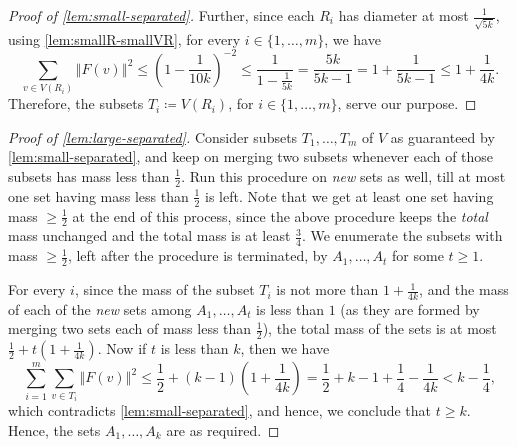 \documentclass[12pt,a4paper,bold]{thesis}
\theoremstyle{definition}
\newcommand*{\norm}[2][]{\left\Vert #2 \right\Vert_{#1}}
\begin{document}
\begin{proof}[Proof of \cref{lem:small-separated}]
    Further, since each $R_i$ has diameter at most $\frac{1}{\sqrt{5k}}$, using 
    \cref{lem:smallR-smallVR}, for every $i \in \{1, \dots, m\}$, we have
    \begin{equation*}
        \sum_{v \in V(R_i)} \norm{F(v)}^2 \leq \left(1 - \frac{1}{10k}\right)^{-2}
        \leq \frac{1}{1 - \frac{1}{5k}} = \frac{5k}{5k-1} = 1 + \frac{1}{5k-1}
        \leq 1 + \frac{1}{4k}.
    \end{equation*} 
	Therefore, the subsets $T_i \coloneq V(R_i)$, for $i \in \{1, \dots, m\}$, serve our purpose.
\end{proof}

\begin{proof}[Proof of \cref{lem:large-separated}]
    Consider subsets $T_1, \dots, T_m$ of $V$ as guaranteed by \cref{lem:small-separated},
    and keep on merging two subsets whenever each of those subsets has mass less than 
    $\frac{1}{2}$. Run this procedure on \emph{new} sets as well, till at most one set 
    having mass less than $\frac{1}{2}$ is left. Note that we get at least one set 
    having mass $\geq \frac{1}{2}$ at the end of this process, since the above procedure 
    keeps the \emph{total} mass unchanged and the total mass is at least $\frac{3}{4}$. 
    We enumerate the subsets with mass $\geq \frac{1}{2}$, 
    left after the procedure is terminated, by $A_1, \dots, A_t$ for some $t \geq 1$. 

    For every $i$, since the mass of the subset $T_i$ is not more than $1 + \frac{1}{4k}$, 
    and the mass of each of the \emph{new} sets among $A_1, \dots, A_t$ is less than $1$ 
    (as they are formed by merging two sets each of mass less than $\frac{1}{2}$), 
    the total mass of the sets is at most $\frac{1}{2} + t \left(1 + \frac{1}{4k}\right)$.
    Now if $t$ is less than $k$, then we have
    \begin{equation*}
        \sum_{i=1}^{m} \sum_{v \in T_i} \norm{F(v)}^2 
        \leq \frac{1}{2} + (k-1) \left(1 + \frac{1}{4k}\right)
        = \frac{1}{2} + k - 1 + \frac{1}{4} - \frac{1}{4k} < k - \frac{1}{4},
    \end{equation*}
    which contradicts \cref{lem:small-separated}, and hence, we conclude that $t \geq k$.
    Hence, the sets $A_1, \dots, A_k$ are as required.
\end{proof}
\end{document}
